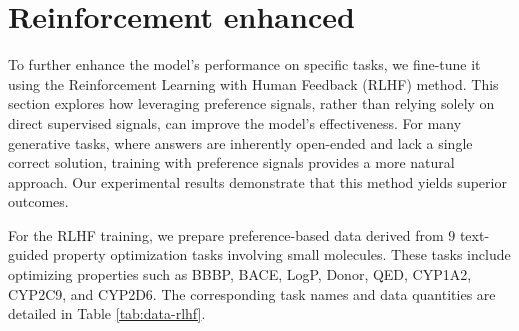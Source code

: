 \section{Reinforcement enhanced \ourM{}}
\label{sec:RL}

To further enhance the model's performance on specific tasks, we fine-tune it using the Reinforcement Learning with Human Feedback (RLHF) method. This section explores how leveraging preference signals, rather than relying solely on direct supervised signals, can improve the model's effectiveness. For many generative tasks, where answers are inherently open-ended and lack a single correct solution, training with preference signals provides a more natural approach. Our experimental results demonstrate that this method yields superior outcomes.


For the RLHF training, we prepare preference-based data derived from $9$ text-guided property optimization tasks involving small molecules. These tasks include optimizing properties such as BBBP, BACE, LogP, Donor, QED, CYP1A2, CYP2C9, and CYP2D6. The corresponding task names and data quantities are detailed in Table \ref{tab:data-rlhf}.



